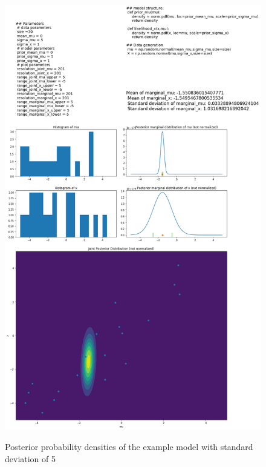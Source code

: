 \documentclass{article}
\begin{document}
\begin{figure}
	\includegraphics[width=\textwidth]{images/ground_truth_posterior_4.png}
	\label{fig:ground_truth_posterior_4}
	\caption[Posterior probability densities of the example model with standard deviation of 5]{Posterior probability densities of the example model with standard deviation of 5}
\end{figure}
\end{document}
